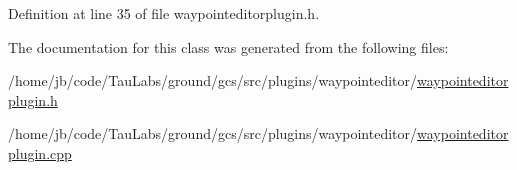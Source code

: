 \-Definition at line 35 of file waypointeditorplugin.\-h.



\-The documentation for this class was generated from the following files\-:\begin{DoxyCompactItemize}
\item 
/home/jb/code/\-Tau\-Labs/ground/gcs/src/plugins/waypointeditor/\hyperlink{waypointeditorplugin_8h}{waypointeditorplugin.\-h}\item 
/home/jb/code/\-Tau\-Labs/ground/gcs/src/plugins/waypointeditor/\hyperlink{waypointeditorplugin_8cpp}{waypointeditorplugin.\-cpp}\end{DoxyCompactItemize}
